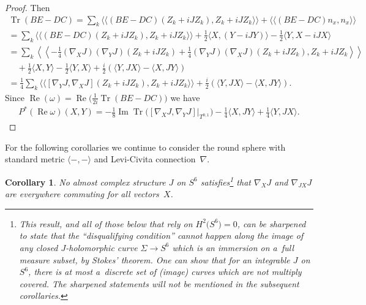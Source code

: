 \documentclass[pdftex]{sigma}
\DeclareMathOperator{\Tr}{Tr}
\newtheorem{cor}[thm]{Corollary}
\numberwithin{equation}{section}
\begin{document}
\begin{proof}
Then
\begin{gather*}
\Tr(BE-DC) = \sum_k \langle\langle (BE-DC) (Z_k + i J Z_k), Z_k + i J Z_k \rangle\rangle + \langle\langle (BE-DC)n_x,n_x \rangle\rangle \\
=\sum_k \langle\langle (BE-DC)( Z_k + i J Z_k), Z_k + i J Z_k \rangle\rangle + \frac 1 2 \langle X , (Y - i J Y) \rangle - \frac 1 2 \langle Y , X-iJX \rangle \\
= \sum_k \left\langle\left\langle -\frac{1}{4} (\nabla_X J) (\nabla_Y J)(Z_k + i J Z_k) +
\frac{1}{4} (\nabla_Y J) (\nabla_X J)(Z_k + i J Z_k)
, Z_k + i J Z_k \right\rangle\right\rangle \\
\quad{} + \frac 1 2 \langle X , Y\rangle - \frac 1 2 \langle Y , X \rangle + \frac i 2 ( \langle Y , JX \rangle - \langle X , JY \rangle ) \\
= \frac{1}{4} \sum_k \langle\langle [ \nabla_Y J , \nabla_X J ] (Z_k + i J Z_k)
, Z_k + i J Z_k \rangle\rangle + \frac i 2 ( \langle Y , JX \rangle - \langle X , JY \rangle ) .
\end{gather*}
Since $\operatorname{Re}(\omega) = \operatorname{Re} \big( \frac{1}{2i} \Tr(BE-DC)\big)$ we have
\begin{gather*}
 P^* (\operatorname{Re} \omega ) (X,Y)
= -\frac{1}{8} \operatorname{Im} \Tr \big( [ \nabla_X J , \nabla_Y J ] \big|_{T^{0,1}} \big)
 - \frac 1 4 \langle X,JY \rangle + \frac 1 4 \langle Y,JX \rangle. \tag*{\qed}
 \end{gather*}\renewcommand{\qed}{}
\end{proof}

For the following corollaries we continue to consider the round sphere with standard metric $\langle - ,- \rangle$ and Levi-Civita connection~$\nabla$.

\begin{cor} \label{cor;commute} No almost complex structure $J$ on $S^6$ satisfies\footnote{This result, and all of those below that rely on $H^2\big(S^6\big) = 0$, can be sharpened to state that the ``disqualifying condition'' cannot happen along the image of any closed $J$-holomorphic curve $\Sigma \to S^6$ which is an immersion on a~full measure subset, by Stokes' theorem. One can show that for an integrable $J$ on $S^6$, there is at most a~discrete set of (image) curves which are not multiply covered. The sharpened statements will not be mentioned in the subsequent corollaries.}
that $\nabla_X J$ and $\nabla_{JX} J$ are eve\-ry\-where commuting for all vectors~$X$.
\end{cor}
\end{document}
